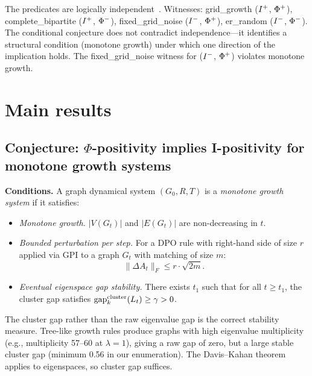 \documentclass{../shared/primo}
\begin{document}
The predicates are logically independent~\cite[Theorem~1]{kowalczyk2026predicates}. Witnesses: grid\_growth ($I\textsuperscript{+}$, $\Phi\textsuperscript{+}$), complete\_bipartite ($I\textsuperscript{+}$, $\Phi\textsuperscript{$-$}$), fixed\_grid\_noise ($I\textsuperscript{$-$}$, $\Phi\textsuperscript{+}$), er\_random ($I\textsuperscript{$-$}$, $\Phi\textsuperscript{$-$}$). The conditional conjecture does not contradict independence---it identifies a structural condition (monotone growth) under which one direction of the implication holds. The fixed\_grid\_noise witness for ($I\textsuperscript{$-$}$, $\Phi\textsuperscript{+}$) violates monotone growth.


\section{Main results}
\label{sec:results}

\subsection{Conjecture: $\Phi$-positivity implies I-positivity for monotone growth systems}

\textbf{Conditions.} A graph dynamical system $(G_0, R, T)$ is a \emph{monotone growth system} if it satisfies:

\begin{itemize}
\item[\textbf{(M1)}] \emph{Monotone growth.} $|V(G_t)|$ and $|E(G_t)|$ are non-decreasing in $t$.
\item[\textbf{(M2)}] \emph{Bounded perturbation per step.} For a DPO rule with right-hand side of size $r$ applied via GPI to a graph $G_t$ with matching of size $m$:
\[
\|\Delta A_t\|_F \leq r \cdot \sqrt{2m}.
\]
\item[\textbf{(M3')}] \emph{Eventual eigenspace gap stability.} There exists $t_1$ such that for all $t \geq t_1$, the cluster gap satisfies $\mathrm{gap}_k^{\mathrm{cluster}}(L_t) \geq \gamma > 0$.
\end{itemize}

\begin{remark}[On M3']
The cluster gap rather than the raw eigenvalue gap is the correct stability measure. Tree-like growth rules produce graphs with high eigenvalue multiplicity (e.g., multiplicity 57--60 at $\lambda = 1$), giving a raw gap of zero, but a large stable cluster gap (minimum 0.56 in our enumeration). The Davis--Kahan theorem~\cite{davis1970rotation} applies to eigenspaces, so cluster gap suffices.
\end{remark}
\end{document}
